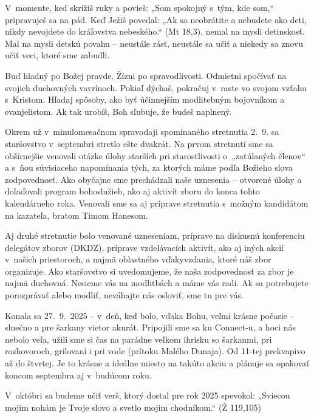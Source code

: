 V~momente, keď skrížiš ruky a povieš: „Som spokojný s~tým, kde som,“ pripravuješ sa na pád. Keď Ježiš povedal: „Ak sa neobrátite a nebudete ako deti, nikdy nevojdete do kráľovstva nebeského.“ (Mt 18,3), nemal na mysli detinskosť. Mal na mysli detskú povahu -- neustále rásť, neustále sa učiť a niekedy sa znovu učiť veci, ktoré sme zabudli.

Buď hladný po Božej pravde. Žízni po spravodlivosti. Odmietni spočívať na svojich duchovných vavrínoch. Pokiaľ dýchaš, pokračuj v~raste vo svojom vzťahu s~Kristom. Hľadaj spôsoby, ako byť účinnejším modlitebným bojovníkom a evanjelistom. Ak tak urobíš, Boh sľubuje, že budeš naplnený.


Okrem už v~minulomesačnom spravodaji spomínaného stretnutia 2.~9. sa staršovstvo v~septembri stretlo ešte dvakrát.
Na prvom stretnutí sme sa obšírnejšie venovali otázke úlohy starších pri starostlivosti o~„zatúlaných členov“ a s~ňou súvisiaceho napomínania tých, za ktorých máme podľa Božieho slova zodpovednosť.
Ako obyčajne sme prechádzali naše uznesenia -- otvorené úlohy a dolaďovali program bohoslužieb, ako aj aktivít zboru do konca tohto kalendárneho roka. Venovali sme sa aj príprave stretnutia s~možným kandidátom na kazateľa, bratom Timom Hanesom.

Aj druhé stretnutie bolo venované uzneseniam, príprave na diskusnú konferenciu delegátov zborov (DKDZ), príprave vzdelávacích aktivít, ako aj iných akcií v~našich priestoroch, a najmä oblastného vďakyvzdania, ktoré náš zbor organizuje.
Ako staršovstvo si uvedomujeme, že naša zodpovednosť za zbor je najmä duchovná. Nesieme vás na modlitbách a máme vás radi. Ak sa potrebujete porozprávať alebo modliť, neváhajte nás osloviť, sme tu pre vás.
\vfill\break


Konala sa 27.~9.~2025 -- v~deň, keď bolo, vďaka Bohu, veľmi krásne počasie -- slnečno a pre šarkany vietor akurát. Pripojili sme sa ku Connect-u, a hoci nás nebolo veľa, užili sme si čas na parádne veľkom ihrisku so šarkanmi, pri rozhovoroch, grilovaní i pri vode (prítoku Malého Dunaja). Od 11-tej prekvapivo až do štvrtej. Je to krásne a ideálne miesto na takúto akciu a plánuje sa opakovať koncom septembra aj v~budúcom roku.


V~októbri sa budeme učiť verš, ktorý dostal pre rok 2025 spevokol: „Sviecou mojim nohám je Tvoje slovo a svetlo mojim chodníkom.“ (Ž 119,105)


